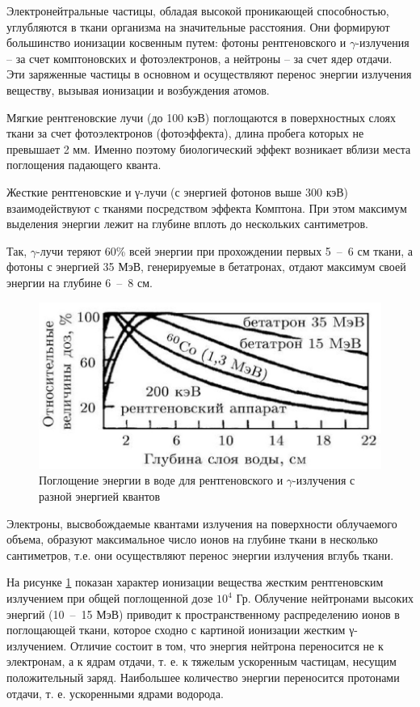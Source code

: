\documentclass[a4paper, 14pt]{article}
\begin{document}
Электронейтральные частицы, обладая высокой проникающей способностью,
углубляются в ткани организма на значительные расстояния. Они формируют
большинство ионизации косвенным путем: фотоны рентгеновского и $\gamma$-излучения – за
счет комптоновских и фотоэлектронов, а нейтроны – за счет ядер отдачи. Эти
заряженные частицы в основном и осуществляют перенос энергии излучения
веществу, вызывая ионизации и возбуждения атомов.

Мягкие рентгеновские лучи (до 100 кэВ) поглощаются в поверхностных слоях
ткани за счет фотоэлектронов (фотоэффекта), длина пробега которых не превышает 2 мм. Именно поэтому биологический эффект возникает вблизи места поглощения падающего кванта.

Жесткие рентгеновские и γ-лучи (с энергией фотонов выше 300 кэВ)
взаимодействуют с тканями посредством эффекта Комптона. При этом максимум
выделения энергии лежит на глубине вплоть до нескольких сантиметров.

Так, $\gamma$-лучи  теряют 60\% всей энергии при прохождении первых 5~--~6 см ткани, а фотоны с энергией 35 МэВ, генерируемые в бетатронах, отдают максимум своей
энергии на глубине 6~--~8 см.
\begin{figure}[htbp]
    \centering
    \includegraphics[width=.5\textwidth]{adsorbInWater.jpg}
    \caption{Поглощение энергии в воде для рентгеновского и $\gamma$-излучения  с разной энергией квантов}
    \label{adsorbInWater}
\end{figure}
Электроны, высвобождаемые квантами излучения на поверхности облучаемого объема, образуют максимальное число ионов на глубине ткани в несколько сантиметров, т.е. они осуществляют перенос энергии излучения вглубь ткани. 

На рисунке \ref{adsorbInWater} показан характер ионизации вещества жестким рентгеновским излучением при общей поглощенной дозе $10^4$ Гр. Облучение нейтронами высоких энергий (10~--~15 МэВ) приводит к пространственному распределению ионов в поглощающей ткани, которое сходно с картиной ионизации жестким γ-излучением. Отличие состоит в том, что энергия нейтрона переносится не к электронам, а к ядрам отдачи, т. е. к тяжелым ускоренным частицам, несущим положительный заряд. Наибольшее количество энергии переносится протонами отдачи, т. е. ускоренными ядрами водорода. 
\end{document}

